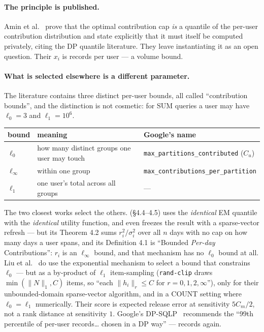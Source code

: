 \documentclass[11pt,a4paper]{article}
\newcommand{\Cu}{C_u}
\begin{document}
\paragraph{The principle is published.} Amin et al.~\cite{amin2019} prove that the optimal
contribution cap \emph{is} a quantile of the per-user contribution distribution and state
explicitly that it must itself be computed privately, citing the DP quantile literature. They leave
instantiating it as an open question. Their $x_i$ is records per user --- a volume bound.

\paragraph{What is selected elsewhere is a different parameter.} The literature contains three
distinct per-user bounds, all called ``contribution bounds'', and the distinction is not cosmetic:
for SUM queries a user may have $\ell_0 = 3$ and $\ell_1 = 10^6$.

\begin{center}\small
\begin{tabular}{lll}
\toprule
bound & meaning & Google's name \\
\midrule
$\ell_0$ & how many distinct groups one user may touch & \verb|max_partitions_contributed| ($\Cu$) \\
$\ell_\infty$ & within one group & \verb|max_contributions_per_partition| \\
$\ell_1$ & one user's total across all groups & --- \\
\bottomrule
\end{tabular}
\end{center}

The two closest works select the others. \cite{click2024} (\S4.4--4.5) uses the \emph{identical} EM
quantile with the \emph{identical} utility function, and even freezes the result with a
sparse-vector refresh --- but its Theorem 4.2 sums $r_i^2/\sigma_i^2$ over all $n$ days with no cap
on how many days a user spans, and its Definition 4.1 is ``Bounded \emph{Per-day} Contributions'':
$r_i$ is an $\ell_\infty$ bound, and that mechanism has no $\ell_0$ bound at all. Liu et
al.~\cite{liu2023} do use the exponential mechanism to select a bound that constrains $\ell_0$ --- but
as a by-product of $\ell_1$ item-sampling (\texttt{rand-clip} draws $\min(\|N\|_1, C)$ items, so
``each $\|h_i\|_r \le C$ for $r = 0,1,2,\infty$''), only for their unbounded-domain sparse-vector
algorithm, and in a COUNT setting where $\ell_0 = \ell_1$ numerically. Their score is expected
release error at sensitivity $5C_m/2$, not a rank distance at sensitivity $1$. Google's
DP-SQLP~\cite{dpsqlp2024} recommends the ``99th percentile of per-user records… chosen in a DP way''
--- records again.
\end{document}
